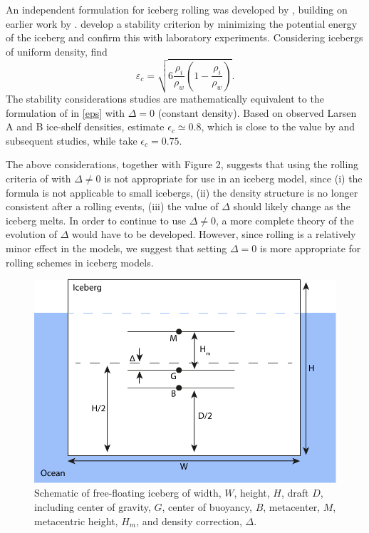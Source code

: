 \documentclass[twocol]{ametsoc_tw}
\newcommand{\ri}{\rho_i}
\newcommand{\rw}{\rho_w}
\begin{document}
An independent formulation for iceberg rolling was developed by \cite{Burton:2012hp}, building on earlier work by \cite{MacAyeal:2003bu}. \cite{Burton:2012hp} develop a stability criterion by minimizing the potential energy of the iceberg and confirm this with laboratory experiments. Considering icebergs of uniform density, \cite{Burton:2012hp} find
$$
\varepsilon_c = \sqrt{6\frac{\ri}{\rw}\left(1 - \frac{\ri}{\rw} \right)}.
$$ 
The stability considerations \cite{Burton:2012hp} studies are mathematically equivalent to the formulation of \cite{Weeks:1978vi} in \eqref{eps} with $\Delta = 0$ (constant density). Based on observed Larsen A and B ice-shelf densities, \cite{MacAyeal:2003bu} estimate $\epsilon_c \simeq 0.8$, which is close to the value by \cite{Weeks:1978vi} and subsequent studies, while \cite{Burton:2012hp} take $\epsilon_c = 0.75$. 

The above considerations, together with Figure 2, suggests that using the rolling criteria of  \cite{Weeks:1978vi} with $\Delta \ne 0$ is not appropriate for use in an iceberg model, since (i) the formula is not applicable to small icebergs, (ii) the density structure is no longer consistent after a rolling events, (iii) the value of $\Delta$ should likely change as the iceberg melts. In order to continue to use $\Delta \ne 0$, a more complete theory of the evolution of $\Delta$ would have to be developed. However, since rolling is a relatively minor effect in the models, we suggest that setting $\Delta = 0$ is more appropriate for rolling schemes in iceberg models. 


 \begin{figure}[!t]
 \begin{center}
 \hspace{-.5 cm} \includegraphics[width=.85\linewidth]{Figs/Iceberg_Roll_schematic2}
 \caption{Schematic of free-floating iceberg of width, $W$, height, $H$, draft $D$, including center of gravity, $G$, center of buoyancy, $B$, metacenter, $M$, metacentric height, $H_m$, and density correction, $\Delta$. }
 \label{fig:bergschem}
 \end{center}
\end{figure}
\end{document}
